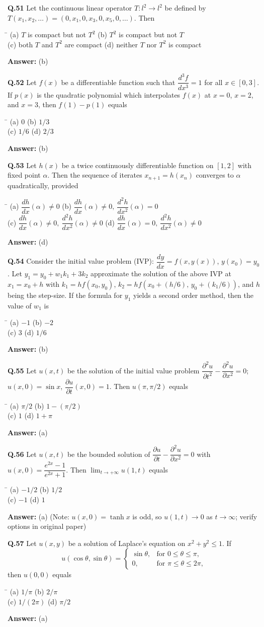 \documentclass[11pt,a4paper]{article}
\newcommand{\optsfour}[4]{%
  \begin{tabbing}
    \hspace{0.48\linewidth}\=\kill
    (a) #1 \> (b) #2 \\[2pt]
    (c) #3 \> (d) #4
  \end{tabbing}%
}
\newcommand{\ans}[1]{\textbf{Answer:} #1\par\medskip}
\begin{document}
\textbf{Q.51} Let the continuous linear operator $T : l^2 \to l^2$ be defined by $T(x_1, x_2, \dots) = (0, x_1, 0, x_3, 0, x_5, 0, \dots)$. Then
\optsfour{$T$ is compact but not $T^2$}{$T^2$ is compact but not $T$}{both $T$ and $T^2$ are compact}{neither $T$ nor $T^2$ is compact}
\ans{(b)}

\textbf{Q.52} Let $f(x)$ be a differentiable function such that $\dfrac{d^3 f}{dx^3} = 1$ for all $x \in [0, 3]$. If $p(x)$ is the quadratic polynomial which interpolates $f(x)$ at $x = 0$, $x = 2$, and $x = 3$, then $f(1) - p(1)$ equals
\optsfour{$0$}{$1/3$}{$1/6$}{$2/3$}
\ans{(b)}

\textbf{Q.53} Let $h(x)$ be a twice continuously differentiable function on $[1, 2]$ with fixed point $\alpha$. Then the sequence of iterates $x_{n+1} = h(x_n)$ converges to $\alpha$ quadratically, provided
\optsfour{$\dfrac{dh}{dx}(\alpha) \ne 0$}{$\dfrac{dh}{dx}(\alpha) \ne 0,\ \dfrac{d^2 h}{dx^2}(\alpha) = 0$}{$\dfrac{dh}{dx}(\alpha) \ne 0,\ \dfrac{d^2 h}{dx^2}(\alpha) \ne 0$}{$\dfrac{dh}{dx}(\alpha) = 0,\ \dfrac{d^2 h}{dx^2}(\alpha) \ne 0$}
\ans{(d)}

\textbf{Q.54} Consider the initial value problem (IVP): $\dfrac{dy}{dx} = f(x, y(x))$, $y(x_0) = y_0$. Let $y_1 = y_0 + w_1 k_1 + 3k_2$ approximate the solution of the above IVP at $x_1 = x_0 + h$ with $k_1 = h f(x_0, y_0)$, $k_2 = h f(x_0 + (h/6),\, y_0 + (k_1/6))$, and $h$ being the step-size. If the formula for $y_1$ yields a second order method, then the value of $w_1$ is
\optsfour{$-1$}{$-2$}{$3$}{$1/6$}
\ans{(b)}

\textbf{Q.55} Let $u(x,t)$ be the solution of the initial value problem $\dfrac{\partial^2 u}{\partial t^2} - \dfrac{\partial^2 u}{\partial x^2} = 0$; $u(x,0) = \sin x$, $\dfrac{\partial u}{\partial t}(x,0) = 1$. Then $u(\pi, \pi/2)$ equals
\optsfour{$\pi/2$}{$1 - (\pi/2)$}{$1$}{$1 + \pi$}
\ans{(a)}

\textbf{Q.56} Let $u(x,t)$ be the bounded solution of $\dfrac{\partial u}{\partial t} - \dfrac{\partial^2 u}{\partial x^2} = 0$ with $u(x,0) = \dfrac{e^{2x} - 1}{e^{2x} + 1}$. Then $\displaystyle\lim_{t\to+\infty} u(1, t)$ equals
\optsfour{$-1/2$}{$1/2$}{$-1$}{$1$}
\ans{(a) (Note: $u(x,0)=\tanh x$ is odd, so $u(1,t) \to 0$ as $t\to\infty$; verify options in original paper)}

\textbf{Q.57} Let $u(x,y)$ be a solution of Laplace's equation on $x^2 + y^2 \le 1$. If
\[
  u(\cos\theta, \sin\theta) = \begin{cases} \sin\theta, & \text{for } 0 \le \theta \le \pi, \\ 0, & \text{for } \pi \le \theta \le 2\pi, \end{cases}
\]
then $u(0, 0)$ equals
\optsfour{$1/\pi$}{$2/\pi$}{$1/(2\pi)$}{$\pi/2$}
\ans{(a)}
\end{document}
